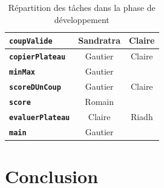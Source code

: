 \documentclass[11pt]{report}
\begin{document}
\begin{table}[h]
\begin{center}
\begin{tabular}{c|c|c|}
 \multicolumn{1}{|l|}{ \textbf{\texttt{coupValide}}} & Sandratra & Claire\\ \hline
  \multicolumn{1}{|l|}{\textbf{\texttt{copierPlateau}}} & Gautier & Claire \\ \hline
  \multicolumn{1}{|l|}{\textbf{\texttt{minMax}}} & Gautier & \cellcolor{lightgray} \\ \hline
  \multicolumn{1}{|l|}{\textbf{\texttt{scoreDUnCoup}}} & Gautier & Claire \\ \hline
  \multicolumn{1}{|l|}{\textbf{\texttt{score}}} & Romain &   \cellcolor{lightgray}  \\ \hline
 \multicolumn{1}{|l|}{ \textbf{\texttt{evaluerPlateau}}} & Claire &  Riadh \\ \hline
 \multicolumn{1}{|l|}{ \textbf{\texttt{main}}} & Gautier & \cellcolor{lightgray} \\ \hline
\end{tabular}
\end{center}
\caption{Répartition des tâches dans la phase de développement}
\end{table}
\thispagestyle{plain}
\chapter*{Conclusion}
\end{document}
